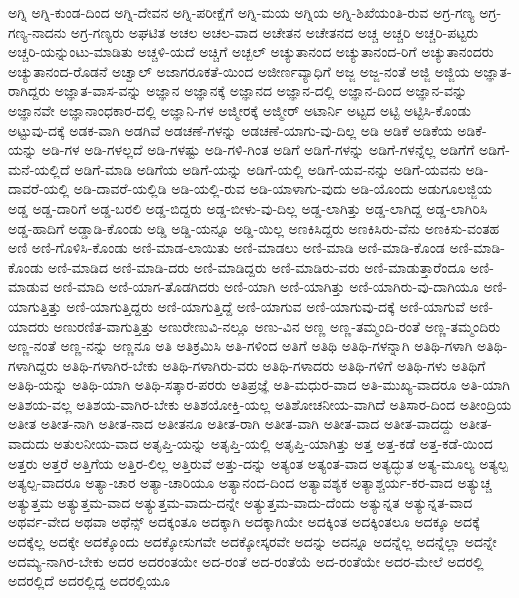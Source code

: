 {ಅಗ್ನಿ
ಅಗ್ನಿ-ಕುಂಡ-ದಿಂದ
ಅಗ್ನಿ-ದೇವನ
ಅಗ್ನಿ-ಪರೀಕ್ಷೆಗೆ
ಅಗ್ನಿ-ಮಯ
ಅಗ್ನಿಯ
ಅಗ್ನಿ-ಶಿಖೆಯಂತಿ-ರುವ
ಅಗ್ರ-ಗಣ್ಯ
ಅಗ್ರ-ಗಣ್ಯ-ನಾದನು
ಅಗ್ರ-ಗಣ್ಯರು
ಅಘಟಿತ
ಅಚಲ
ಅಚಲ-ವಾದ
ಅಚೇತನ
ಅಚೇತನದ
ಅಚ್ಚ
ಅಚ್ಚರಿ
ಅಚ್ಚರಿ-ಪಟ್ಟರು
ಅಚ್ಚರಿ-ಯನ್ನುಂಟು-ಮಾಡಿತು
ಅಚ್ಚಳಿ-ಯದೆ
ಅಚ್ಚಿಗೆ
ಅಚ್ಬಲ್
ಅಚ್ಯುತಾನಂದ
ಅಚ್ಯುತಾನಂದ-ರಿಗೆ
ಅಚ್ಯುತಾನಂದರು
ಅಚ್ಯುತಾನಂದ-ರೊಡನೆ
ಅಚ್ವಾಲ್
ಅಜಾಗರೂಕತೆ-ಯಿಂದ
ಅಜೀರ್ಣವ್ಯಾಧಿಗೆ
ಅಜ್ಜ
ಅಜ್ಜ-ನಂತೆ
ಅಜ್ಜಿ
ಅಜ್ಜಿಯ
ಅಜ್ಞಾತ-ರಾಗಿದ್ದರು
ಅಜ್ಞಾತ-ವಾಸ-ವನ್ನು
ಅಜ್ಞಾನ
ಅಜ್ಞಾನಕ್ಕೆ
ಅಜ್ಞಾನದ
ಅಜ್ಞಾನ-ದಲ್ಲಿ
ಅಜ್ಞಾನ-ದಿಂದ
ಅಜ್ಞಾನ-ವನ್ನು
ಅಜ್ಞಾನವೇ
ಅಜ್ಞಾನಾಂಧಕಾರ-ದಲ್ಲಿ
ಅಜ್ಞಾನಿ-ಗಳ
ಅಜ್ಮೀರಕ್ಕೆ
ಅಜ್ಮೀರ್
ಅಟಾರ್ನಿ
ಅಟ್ಟದ
ಅಟ್ಟಿ
ಅಟ್ಟಿಸಿ-ಕೊಂಡು
ಅಟ್ಟುವು-ದಕ್ಕೆ
ಅಡಕ-ವಾಗಿ
ಅಡಗಿವೆ
ಅಡಚಣೆ-ಗಳನ್ನು
ಅಡಚಣೆ-ಯಾಗು-ವು-ದಿಲ್ಲ
ಅಡಿ
ಅಡಿಕೆ
ಅಡಿಕೆಯ
ಅಡಿಕೆ-ಯನ್ನು
ಅಡಿ-ಗಳ
ಅಡಿ-ಗಳಲ್ಲದೆ
ಅಡಿ-ಗಳಷ್ಟು
ಅಡಿ-ಗಳಿ-ಗಿಂತ
ಅಡಿಗೆ
ಅಡಿಗೆ-ಗಳನ್ನು
ಅಡಿಗೆ-ಗಳನ್ನೆಲ್ಲ
ಅಡಿಗೆಗೆ
ಅಡಿಗೆ-ಮನೆ-ಯಲ್ಲಿದೆ
ಅಡಿಗೆ-ಮಾಡಿ
ಅಡಿಗೆಯ
ಅಡಿಗೆ-ಯನ್ನು
ಅಡಿಗೆ-ಯಲ್ಲಿ
ಅಡಿಗೆ-ಯವ-ನನ್ನು
ಅಡಿಗೆ-ಯವನು
ಅಡಿ-ದಾವರೆ-ಯಲ್ಲಿ
ಅಡಿ-ದಾವರೆ-ಯಲ್ಲಿಡಿ
ಅಡಿ-ಯಲ್ಲಿ-ರುವ
ಅಡಿ-ಯಾಳಾಗು-ವುದು
ಅಡಿ-ಯೊಂದು
ಅಡುಗೂಲಜ್ಜಿಯ
ಅಡ್ಡ
ಅಡ್ಡ-ದಾರಿಗೆ
ಅಡ್ಡ-ಬರಲಿ
ಅಡ್ಡ-ಬಿದ್ದರು
ಅಡ್ಡ-ಬೀಳು-ವು-ದಿಲ್ಲ
ಅಡ್ಡ-ಲಾಗಿತ್ತು
ಅಡ್ಡ-ಲಾಗಿದ್ದ
ಅಡ್ಡ-ಲಾಗಿರಿಸಿ
ಅಡ್ಡ-ಹಾದಿಗೆ
ಅಡ್ಡಾಡಿ-ಕೊಂಡು
ಅಡ್ಡಿ
ಅಡ್ಡಿ-ಯನ್ನೂ
ಅಡ್ಡಿ-ಯಿಲ್ಲ
ಅಣಕಿಸಿದ್ದರು
ಅಣಕಿಸಿರು-ವೆನು
ಅಣಕಿಸು-ವಂತಹ
ಅಣಿ
ಅಣಿ-ಗೊಳಿಸಿ-ಕೊಂಡು
ಅಣಿ-ಮಾಡ-ಲಾಯಿತು
ಅಣಿ-ಮಾಡಲು
ಅಣಿ-ಮಾಡಿ
ಅಣಿ-ಮಾಡಿ-ಕೊಂಡ
ಅಣಿ-ಮಾಡಿ-ಕೊಂಡು
ಅಣಿ-ಮಾಡಿದ
ಅಣಿ-ಮಾಡಿ-ದರು
ಅಣಿ-ಮಾಡಿದ್ದರು
ಅಣಿ-ಮಾಡಿರು-ವರು
ಅಣಿ-ಮಾಡುತ್ತಾರೆಂದೂ
ಅಣಿ-ಮಾಡುವ
ಅಣಿ-ಮಾದಿ
ಅಣಿ-ಯಾಗ-ತೊಡಗಿದರು
ಅಣಿ-ಯಾಗಿ
ಅಣಿ-ಯಾಗಿತ್ತು
ಅಣಿ-ಯಾಗಿರು-ವು-ದಾಗಿಯೂ
ಅಣಿ-ಯಾಗುತ್ತಿತ್ತು
ಅಣಿ-ಯಾಗುತ್ತಿದ್ದರು
ಅಣಿ-ಯಾಗುತ್ತಿದ್ದೆ
ಅಣಿ-ಯಾಗುವ
ಅಣಿ-ಯಾಗುವು-ದಕ್ಕೆ
ಅಣಿ-ಯಾಗುವೆ
ಅಣಿ-ಯಾದರು
ಅಣುರಣಿತ-ವಾಗುತ್ತಿತ್ತು
ಅಣುರೇಣುವಿ-ನಲ್ಲೂ
ಅಣು-ವಿನ
ಅಣ್ಣ
ಅಣ್ಣ-ತಮ್ಮಂದಿ-ರಂತೆ
ಅಣ್ಣ-ತಮ್ಮಂದಿರು
ಅಣ್ಣ-ನಂತೆ
ಅಣ್ಣ-ನನ್ನು
ಅಣ್ಣನೂ
ಅತಿ
ಅತಿಕ್ರಮಿಸಿ
ಅತಿ-ಗಳಿಂದ
ಅತಿಗೆ
ಅತಿಥಿ
ಅತಿಥಿ-ಗಳನ್ನಾಗಿ
ಅತಿಥಿ-ಗಳಾಗಿ
ಅತಿಥಿ-ಗಳಾಗಿದ್ದರು
ಅತಿಥಿ-ಗಳಾಗಿರ-ಬೇಕು
ಅತಿಥಿ-ಗಳಾಗಿರು-ವರು
ಅತಿಥಿ-ಗಳಾದರು
ಅತಿಥಿ-ಗಳಿಗೆ
ಅತಿಥಿ-ಗಳು
ಅತಿಥಿಗೆ
ಅತಿಥಿ-ಯನ್ನು
ಅತಿಥಿ-ಯಾಗಿ
ಅತಿಥಿ-ಸತ್ಕಾರ-ಪರರು
ಅತಿಪ್ರಜ್ಞೆ
ಅತಿ-ಮಧುರ-ವಾದ
ಅತಿ-ಮುಖ್ಯ-ವಾದರೂ
ಅತಿ-ಯಾಗಿ
ಅತಿಶಯ-ವಲ್ಲ
ಅತಿಶಯ-ವಾಗಿರ-ಬೇಕು
ಅತಿಶಯೋಕ್ತಿ-ಯಲ್ಲ
ಅತಿಶೋಚನೀಯ-ವಾಗಿದೆ
ಅತಿಸಾರ-ದಿಂದ
ಅತೀಂದ್ರಿಯ
ಅತೀತ
ಅತೀತ-ನಾಗಿ
ಅತೀತ-ನಾದ
ಅತೀತನೂ
ಅತೀತ-ರಾಗಿ
ಅತೀತ-ವಾಗಿ
ಅತೀತ-ವಾದ
ಅತೀತ-ವಾದದ್ದು
ಅತೀತ-ವಾದುದು
ಅತುಲನೀಯ-ವಾದ
ಅತೃಪ್ತಿ-ಯನ್ನು
ಅತೃಪ್ತಿ-ಯಲ್ಲಿ
ಅತೃಪ್ತಿ-ಯಾಗಿತ್ತು
ಅತ್ತ
ಅತ್ತ-ಕಡೆ
ಅತ್ತ-ಕಡೆ-ಯಿಂದ
ಅತ್ತರು
ಅತ್ತರೆ
ಅತ್ತಿಗೆಯ
ಅತ್ತಿರ-ಲಿಲ್ಲ
ಅತ್ತಿರುವೆ
ಅತ್ತು-ದನ್ನು
ಅತ್ಯಂತ
ಅತ್ಯಂತ-ವಾದ
ಅತ್ಯದ್ಭುತ
ಅತ್ಯ-ಮೂಲ್ಯ
ಅತ್ಯಲ್ಪ
ಅತ್ಯಲ್ಪ-ವಾದರೂ
ಅತ್ಯಾ-ಚಾರ
ಅತ್ಯಾ-ಚಾರಿಯೂ
ಅತ್ಯಾನಂದ-ದಿಂದ
ಅತ್ಯಾವಶ್ಯಕ
ಅತ್ಯಾಶ್ಚರ್ಯ-ಕರ-ವಾದ
ಅತ್ಯುಚ್ಚ
ಅತ್ಯುತ್ತಮ
ಅತ್ಯುತ್ತಮ-ವಾದ
ಅತ್ಯುತ್ತಮ-ವಾದು-ದನ್ನೇ
ಅತ್ಯುತ್ತಮ-ವಾದು-ದೆಂದು
ಅತ್ಯುನ್ನತ
ಅತ್ಯುನ್ನತ-ವಾದ
ಅಥರ್ವ-ವೇದ
ಅಥವಾ
ಅಥೆನ್ಸ್
ಅದಕ್ಕಂತೂ
ಅದಕ್ಕಾಗಿ
ಅದಕ್ಕಾಗಿಯೇ
ಅದಕ್ಕಿಂತ
ಅದಕ್ಕಿಂತಲೂ
ಅದಕ್ಕೂ
ಅದಕ್ಕೆ
ಅದಕ್ಕೆಲ್ಲ
ಅದಕ್ಕೇ
ಅದಕ್ಕೊಂದು
ಅದಕ್ಕೋಸುಗವೇ
ಅದಕ್ಕೋಸ್ಕರವೇ
ಅದನ್ನು
ಅದನ್ನೂ
ಅದನ್ನೆಲ್ಲ
ಅದನ್ನೆಲ್ಲಾ
ಅದನ್ನೇ
ಅದಮ್ಯ-ನಾಗಿರ-ಬೇಕು
ಅದರ
ಅದರಂತಯೇ
ಅದ-ರಂತೆ
ಅದ-ರಂತೆಯೆ
ಅದ-ರಂತೆಯೇ
ಅದರ-ಮೇಲೆ
ಅದರಲ್ಲಿ
ಅದರಲ್ಲಿದೆ
ಅದರಲ್ಲಿದ್ದ
ಅದರಲ್ಲಿಯೂ
}
